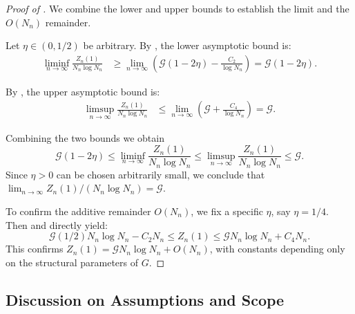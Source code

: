 \documentclass{article}
\numberwithin{equation}{section}
\theoremstyle{definition}
\theoremstyle{remark}
\newcommand{\cG}{\mathcal{G}}
\begin{document}
\begin{proof}[Proof of ]
We combine the lower and upper bounds to establish the limit and the $O(N_n)$ remainder.

Let $\eta \in (0,1/2)$ be arbitrary. By , the lower asymptotic bound is:
\begin{align*}
\liminf_{n \to \infty} \frac{Z_n(1)}{N_n \log N_n} &\geq \lim_{n \to \infty} \left( \cG(1-2\eta) - \frac{C_2}{\log N_n} \right) = \cG(1-2\eta).
\end{align*}

By , the upper asymptotic bound is:
\begin{align*}
\limsup_{n \to \infty} \frac{Z_n(1)}{N_n \log N_n} &\leq \lim_{n \to \infty} \left( \cG + \frac{C_4}{\log N_n} \right) = \cG.
\end{align*}

Combining the two bounds we obtain
\[
\cG(1-2\eta) \leq \liminf_{n \to \infty} \frac{Z_n(1)}{N_n \log N_n} \leq \limsup_{n \to \infty} \frac{Z_n(1)}{N_n \log N_n} \leq \cG.
\]
Since $\eta > 0$ can be chosen arbitrarily small, we conclude that $\lim_{n \to \infty} Z_n(1) / (N_n \log N_n) = \cG$.

To confirm the additive remainder $O(N_n)$, we fix a specific $\eta$, say $\eta=1/4$. Then  and  directly yield:
\[
\cG(1/2) N_n \log N_n - C_2 N_n \leq Z_n(1) \leq \cG N_n \log N_n + C_4 N_n.
\]
This confirms $Z_n(1) = \cG N_n \log N_n + O(N_n)$, with constants depending only on the structural parameters of $G$.
\end{proof}

\subsection{Discussion on Assumptions and Scope}
\end{document}
